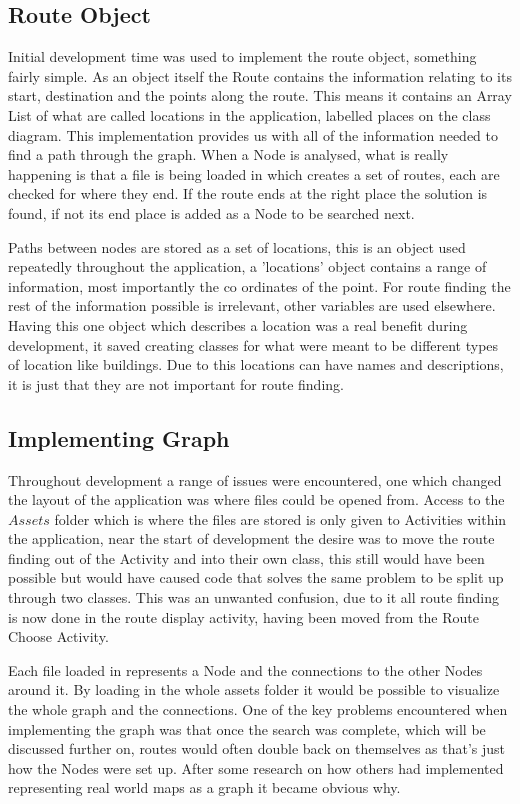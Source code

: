\subsection{Route Object}

Initial development time was used to implement the route object, something fairly simple. As an object itself the Route contains the information relating to its start, destination and the points along the route. This means it contains an Array List of what are called locations in the application, labelled places on the class diagram. This implementation provides us with all of the information needed to find a path through the graph. When a Node is analysed, what is really happening is that a file is being loaded in which creates a set of routes, each are checked for where they end. If the route ends at the right place the solution is found, if not its end place is added as a Node to be searched next. 

Paths between nodes are stored as a set of locations, this is an object used repeatedly throughout the application, a 'locations' object contains a range of information, most importantly the co ordinates of the point. For route finding the rest of the information possible is irrelevant, other variables are used elsewhere. Having this one object which describes a location was a real benefit during development, it saved creating classes for what were meant to be different types of location like buildings. Due to this locations can have names and descriptions, it is just that they are not important for route finding. 

\subsection{Implementing Graph}

Throughout development a range of issues were encountered, one which changed the layout of the application was where files could be opened from. Access to the $Assets$ folder which is where the files are stored is only given to Activities within the application, near the start of development the desire was to move the route finding out of the Activity and into their own class, this still would have been possible but would have caused code that solves the same problem to be split up through two classes. This was an unwanted confusion, due to it all route finding is now done in the route display activity, having been moved from the Route Choose Activity. 

Each file loaded in represents a Node and the connections to the other Nodes around it. By loading in the whole assets folder it would be possible to visualize the whole graph and the connections. One of the key problems encountered when implementing the graph was that once the search was complete, which will be discussed further on, routes would often double back on themselves as that's just how the Nodes were set up. After some research on how others had implemented representing real world maps as a graph it became obvious why.

